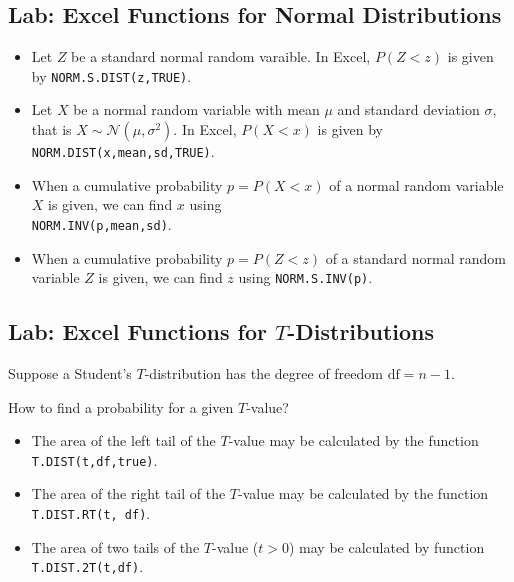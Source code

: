 \vspace*{6\baselineskip}

\hypertarget{lab-excel-functions-for-normal-distributions}{%
\subsection{Lab: Excel Functions for Normal
Distributions}\label{lab-excel-functions-for-normal-distributions}}

\begin{itemize}
\item
  Let \(Z\) be a standard normal random varaible. In Excel, \(P(Z<z)\)
  is given by \texttt{NORM.S.DIST(z,TRUE)}.
\item
  Let \(X\) be a normal random variable with mean \(\mu\) and standard
  deviation \(\sigma\), that is \(X\sim \mathcal{N}(\mu, \sigma^2)\). In
  Excel, \(P(X<x)\) is given by \texttt{NORM.DIST(x,mean,sd,TRUE)}.
\item
  When a cumulative probability \(p=P(X<x)\) of a normal random variable
  \(X\) is given, we can find \(x\) using\\ \texttt{NORM.INV(p,mean,sd)}.
\item
  When a cumulative probability \(p=P(Z<z)\) of a standard normal random
  variable \(Z\) is given, we can find \(z\) using
  \texttt{NORM.S.INV(p)}.
\end{itemize}

\hypertarget{lab-excel-functions-for-t-distributions}{%
\subsection{\texorpdfstring{Lab: Excel Functions for
\(T\)-Distributions}{Lab: Excel Functions for T-Distributions}}\label{lab-excel-functions-for-t-distributions}}

Suppose a Student's \(T\)-distribution has the degree of freedom
\(\text{df}=n-1\).

How to find a probability for a given \(T\)-value?

\begin{itemize}
  \item
    The area of the left tail of the \(T\)-value may be calculated by
    the function \texttt{T.DIST(t,df,true)}.
  \item
    The area of the right tail of the \(T\)-value may be calculated by
    the function \texttt{T.DIST.RT(t,\ df)}.
  \item
    The area of two tails of the \(T\)-value
    (\(t > 0\)) may be calculated by
    function \texttt{T.DIST.2T(t,df)}.
  \end{itemize}
  
